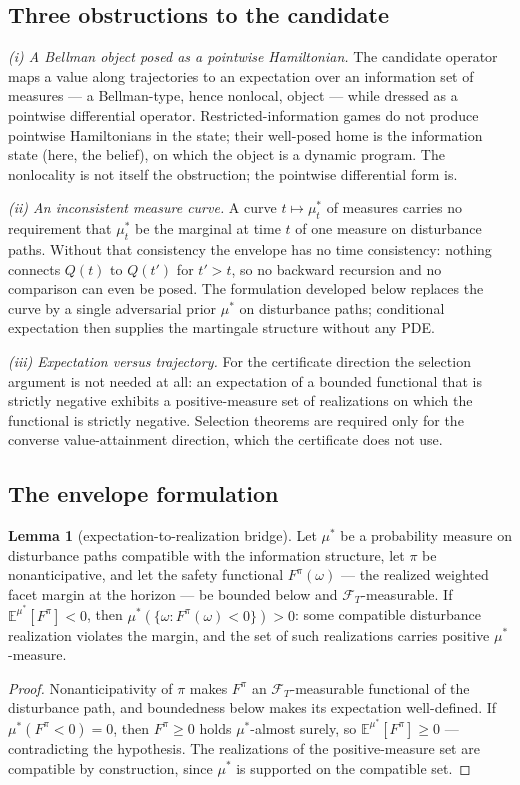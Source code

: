 \documentclass[10pt,twocolumn]{article}
\theoremstyle{definition}
\newtheorem{lemma}{Lemma}
\begin{document}
\subsection{Three obstructions to the candidate}

\emph{(i) A Bellman object posed as a pointwise Hamiltonian.} The candidate operator maps a
value along trajectories to an expectation over an information set of
measures --- a Bellman-type, hence nonlocal, object --- while dressed as a
pointwise differential operator. Restricted-information games do not
produce pointwise Hamiltonians in the state; their well-posed home is the
information state (here, the belief), on which the object is a dynamic
program. The nonlocality is not itself the obstruction; the pointwise differential form is.

\emph{(ii) An inconsistent measure curve.} A curve $t \mapsto
\mu^{*}_{t}$ of measures carries no requirement that $\mu^{*}_{t}$ be the
marginal at time $t$ of one measure on disturbance paths. Without that
consistency the envelope has no time consistency: nothing connects $Q(t)$
to $Q(t')$ for $t' > t$, so no backward recursion and no comparison can
even be posed. The formulation developed below replaces the curve by a single adversarial prior $\mu^{*}$ on disturbance paths; conditional expectation then supplies
the martingale structure without any PDE.

\emph{(iii) Expectation versus trajectory.} For the certificate direction
the selection argument is not needed at all: an expectation of a bounded
functional that is strictly negative exhibits a positive-measure set of
realizations on which the functional is strictly negative. Selection
theorems are required only for the converse value-attainment direction,
which the certificate does not use.

\subsection{The envelope formulation}

\begin{lemma}[expectation-to-realization bridge]\label{lem:bridge}
Let $\mu^{*}$ be a probability measure on disturbance paths compatible with
the information structure, let $\pi$ be nonanticipative, and let the
safety functional $F^{\pi}(\omega)$ --- the realized weighted facet margin
at the horizon --- be bounded below and $\mathcal{F}_{T}$-measurable. If
$\mathbb{E}^{\mu^{*}}[F^{\pi}] < 0$, then
$\mu^{*}(\{\omega: F^{\pi}(\omega) < 0\}) > 0$: some compatible disturbance
realization violates the margin, and the set of such realizations carries
positive $\mu^{*}$-measure.
\end{lemma}
\begin{proof}
Nonanticipativity of $\pi$ makes $F^{\pi}$ an $\mathcal{F}_{T}$-measurable
functional of the disturbance path, and boundedness below makes its
expectation well-defined. If $\mu^{*}(F^{\pi} < 0) = 0$, then
$F^{\pi} \ge 0$ holds $\mu^{*}$-almost surely, so
$\mathbb{E}^{\mu^{*}}[F^{\pi}] \ge 0$ --- contradicting the hypothesis. The
realizations of the positive-measure set are compatible by construction,
since $\mu^{*}$ is supported on the compatible set.
\end{proof}
\end{document}
